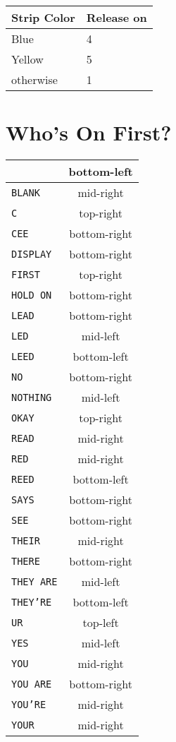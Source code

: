 \documentclass[11pt]{amsart}
\begin{document}
\begin{tabular}{|l|l|}
\hline
Strip Color & Release on \\
\hline
Blue        & 4 \\
Yellow      & 5 \\
otherwise   & 1 \\
\hline
\end{tabular}



\section{Who's On First?}

\begin{tabular}{|l|c|}
\hline
\texttt{}         & bottom-left  \\ \hline
\texttt{BLANK}    & mid-right    \\ \hline
\texttt{C}        & top-right    \\ \hline
\texttt{CEE}      & bottom-right \\ \hline
\texttt{DISPLAY}  & bottom-right \\ \hline
\texttt{FIRST}    & top-right    \\ \hline
\texttt{HOLD ON}  & bottom-right \\ \hline
\texttt{LEAD}     & bottom-right \\ \hline
\texttt{LED}      & mid-left     \\ \hline
\texttt{LEED}     & bottom-left  \\ \hline
\texttt{NO}       & bottom-right \\ \hline
\texttt{NOTHING}  & mid-left     \\ \hline
\texttt{OKAY}     & top-right    \\ \hline
\texttt{READ}     & mid-right    \\ \hline
\texttt{RED}      & mid-right    \\ \hline
\texttt{REED}     & bottom-left  \\ \hline
\texttt{SAYS}     & bottom-right \\ \hline
\texttt{SEE}      & bottom-right \\ \hline
\texttt{THEIR}    & mid-right    \\ \hline
\texttt{THERE}    & bottom-right \\ \hline
\texttt{THEY ARE} & mid-left     \\ \hline
\texttt{THEY'RE}  & bottom-left  \\ \hline
\texttt{UR}       & top-left     \\ \hline
\texttt{YES}      & mid-left     \\ \hline
\texttt{YOU}      & mid-right    \\ \hline
\texttt{YOU ARE}  & bottom-right \\ \hline
\texttt{YOU'RE}   & mid-right    \\ \hline
\texttt{YOUR}     & mid-right    \\ \hline
\end{tabular}
\end{document}
